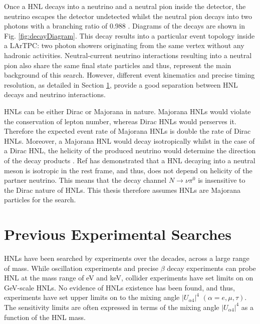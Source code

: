 Once a HNL decays into a neutrino and a neutral pion inside the detector, the neutrino escapes the detector undetected whilst the neutral pion decays into two photons with a branching ratio of 0.988 \cite{}. 
Diagrams of the decays are shown in Fig. \ref{fig:decayDiagram}.
This decay results into a particular event topology inside a LArTPC: two photon showers originating from the same vertex without any hadronic activities.
Neutral-current neutrino interactions resulting into a neutral pion also share the same final state particles and thus, represent the main background of this search.
However, different event kinematics and precise timing resolution, as detailed in Section \ref{}, provide a good separation between HNL decays and neutrino interactions. 

HNLs can be either Dirac or Majorana in nature.
Majorana HNLs would violate the conservation of lepton number, whereas Dirac HNLs would perserves it.
Therefore the expected event rate of Majorana HNLs is double the rate of Dirac HNLs.
Moreover, a Majorana HNL would decay isotropically whilst in the case of a Dirac HNL, the helicity of the produced neutrino would determine the direction of the decay products \cite{}.
Ref \cite{} has demonstrated that a HNL decaying into a neutral meson is isotropic in the rest frame, and thus, does not depend on helicity of the partner neutrino.
This means that the decay channel $N\rightarrow \nu \pi^{0}$ is insensitive to the Dirac nature of HNLs.
This thesis therefore assumes HNLs are Majorana particles for the search.

\section{Previous Experimental Searches}


HNLs have been searched by experiments over the decades, across a large range of mass.
While oscillation experiments and precise $\beta$ decay experiments can probe HNL at the mass range of eV and keV, collider experiments have set limits on on GeV-scale HNLs.
No evidence of HNLs existence has been found, and thus, experiments have set upper limits on to the mixing angle $|U_{\alpha4}|^{4}$ $(\alpha=e,\mu,\tau)$.
The sensitivity limits are often expressed in terms of the mixing angle $|U_{\alpha4}|^{4}$ as a function of the HNL mass.

